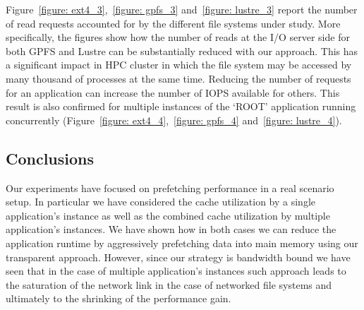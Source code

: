 Figure~\ref{figure: ext4_3},~\ref{figure: gpfs_3} and~\ref{figure: lustre_3} report the number of read requests accounted for by the different file systems under study. More specifically, 
the figures show how the number of reads at the I/O server side for both GPFS and Lustre can be substantially reduced with our approach. This has a significant impact in HPC cluster in 
which the file system may be accessed by many thousand of processes at the same time. Reducing the number of requests for an application can increase the number of IOPS available for others. 
This result is also confirmed for multiple instances of the `ROOT' application running concurrently (Figure~\ref{figure: ext4_4},~\ref{figure: gpfs_4} and~\ref{figure: lustre_4}).

\subsection{Conclusions}
Our experiments have focused on prefetching performance in a real scenario setup. In particular we have considered the cache utilization by a single application's instance as well as the
combined cache utilization by multiple application's instances. We have shown how in both cases we can reduce the application runtime by aggressively prefetching data into main memory using
our transparent approach. However, since our strategy is bandwidth bound we have seen that in the case of multiple application's instances such approach leads to the saturation of the
network link in the case of networked file systems and ultimately to the shrinking of the performance gain.


